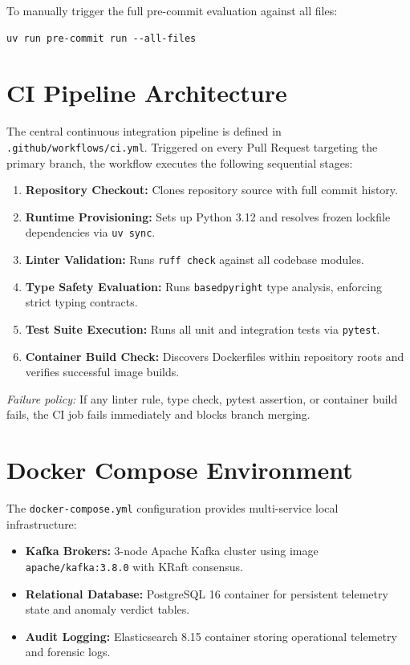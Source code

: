 \documentclass[11pt,a4paper]{article}
\begin{document}
To manually trigger the full pre-commit evaluation against all files:
\begin{lstlisting}
uv run pre-commit run --all-files
\end{lstlisting}

\section{CI Pipeline Architecture}
The central continuous integration pipeline is defined in \texttt{.github/workflows/ci.yml}. Triggered on every Pull Request targeting the primary branch, the workflow executes the following sequential stages:

\begin{enumerate}[leftmargin=*,itemsep=2pt]
  \item \textbf{Repository Checkout:} Clones repository source with full commit history.
  \item \textbf{Runtime Provisioning:} Sets up Python 3.12 and resolves frozen lockfile dependencies via \texttt{uv sync}.
  \item \textbf{Linter Validation:} Runs \texttt{ruff check} against all codebase modules.
  \item \textbf{Type Safety Evaluation:} Runs \texttt{basedpyright} type analysis, enforcing strict typing contracts.
  \item \textbf{Test Suite Execution:} Runs all unit and integration tests via \texttt{pytest}.
  \item \textbf{Container Build Check:} Discovers Dockerfiles within repository roots and verifies successful image builds.
\end{enumerate}

\noindent\textit{Failure policy:} If any linter rule, type check, pytest assertion, or container build fails, the CI job fails immediately and blocks branch merging.

\section{Docker Compose Environment}
The \texttt{docker-compose.yml} configuration provides multi-service local infrastructure:
\begin{itemize}[leftmargin=*,itemsep=2pt]
  \item \textbf{Kafka Brokers:} 3-node Apache Kafka cluster using image \texttt{apache/kafka:3.8.0} with KRaft consensus.
  \item \textbf{Relational Database:} PostgreSQL 16 container for persistent telemetry state and anomaly verdict tables.
  \item \textbf{Audit Logging:} Elasticsearch 8.15 container storing operational telemetry and forensic logs.
\end{itemize}
\end{document}
